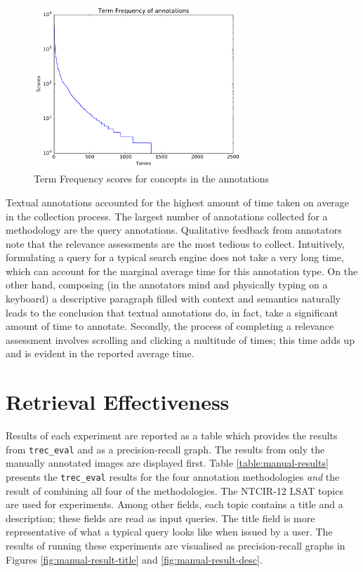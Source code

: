 \begin{figure}[b]
    \centering
    \includegraphics[width=0.7\textwidth]{graphs/tf-scores}
    \caption{Term Frequency scores for concepts in the annotations}
    \label{fig:tf-scores}
\end{figure}

Textual annotations accounted for the highest amount of time taken on average in the collection process. The largest number of annotations collected for a methodology are the query annotations. Qualitative feedback from annotators note that the relevance assessments are the most tedious to collect. Intuitively, formulating a query for a typical search engine does not take a very long time, which can account for the marginal average time for this annotation type. On the other hand, composing (in the annotators mind and physically typing on a keyboard) a descriptive paragraph filled with context and semantics naturally leads to the conclusion that textual annotations do, in fact, take a significant amount of time to annotate. Secondly, the process of completing a relevance assessment involves scrolling and clicking a multitude of times; this time adds up and is evident in the reported average time.

\FloatBarrier
\section{Retrieval Effectiveness}

Results of each experiment are reported as a table which provides the results from \verb|trec_eval| and as a precision-recall graph. The results from only the manually annotated images are displayed first. Table \ref{table:manual-results} presents the \verb|trec_eval| results for the four annotation methodologies \textit{and} the result of combining all four of the methodologies. The  NTCIR-12 LSAT topics are used for experiments. Among other fields, each topic contains a title and a description; these fields are read as input queries. The title field is more representative of what a typical query looks like when issued by a user. The results of running these experiments are visualised as precision-recall graphs in Figures \ref{fig:manual-result-title} and \ref{fig:manual-result-desc}.

